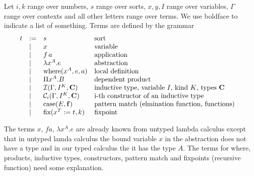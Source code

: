 \begin{definition}
  Let $i,k$ range over numbers, $s$ range over sorts, $x, y, I$ range over
  variables, $\Gamma$ range over contexts and all other letters range over
    terms. We use boldface to indicate a list of something. Terms are defined by
    the grammar
  $$
  \begin{array}{lllll}
    t &:= & s
    & \text{sort}

    \\

      & \mid & x
    & \text{variable}

    \\

      & \mid & f \, a
    & \text{application}

    \\

      & \mid & \lambda x^A. e
    & \text{abstraction}

    \\
        & \mid & \where(x^A, e, a) & \text{local definition}

    \\

      & \mid & \Pi x^A.B
    & \text{dependent product}

    \\

      & \mid & \Inductive (\Gamma, I^K, \vec{C})
      & \text{inductive type, variable $I$, kind $K$, types $\vec{C}$}

    \\

      & \mid & \Constructor_i (\Gamma, I^K, \vec{C})
    & \text{i-th constructor of an inductive type}

    \\


      & \mid & \case(E, \vec{f})
      & \text{pattern match (elmination function, functions)}

    \\

      & \mid & \fix(x^T := t, k)
    & \text{fixpoint}
  \end{array}
  $$
\end{definition}

The terms $x$, $f a$, $\lambda x^A.e$ are already known from untyped lambda
calculus except that in untyped lamda calculus the bound variable $x$ in the
abstraction does not have a type and in our typed calculus the it has the type
$A$. The terms for where, products, inductive types, constructors, pattern match
and fixpoints (recursive function) need some explanation.

